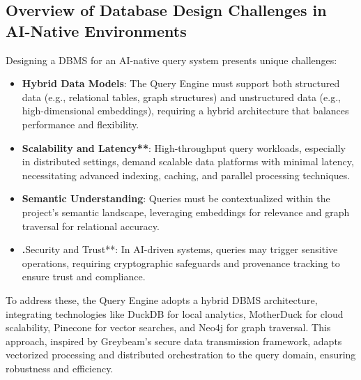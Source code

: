 \documentclass[11pt]{article}
\begin{document}
\subsection{Overview of Database Design Challenges in AI-Native Environments}
Designing a DBMS for an AI-native query system presents unique challenges:
\begin{itemize}
    \item \textbf{Hybrid Data Models}: The Query Engine must support both structured data (e.g., relational tables, graph structures) and unstructured data (e.g., high-dimensional embeddings), requiring a hybrid architecture that balances performance and flexibility.
    \item \textbf{Scalability and Latency**}: High-throughput query workloads, especially in distributed settings, demand scalable data platforms with minimal latency, necessitating advanced indexing, caching, and parallel processing techniques.
    \item \textbf{Semantic Understanding}: Queries must be contextualized within the project’s semantic landscape, leveraging embeddings for relevance and graph traversal for relational accuracy.
    \item \textbf.Security and Trust**: In AI-driven systems, queries may trigger sensitive operations, requiring cryptographic safeguards and provenance tracking to ensure trust and compliance.
\end{itemize}
To address these, the Query Engine adopts a hybrid DBMS architecture, integrating technologies like DuckDB for local analytics, MotherDuck for cloud scalability, Pinecone for vector searches, and Neo4j for graph traversal. This approach, inspired by Greybeam’s secure data transmission framework, adapts vectorized processing and distributed orchestration to the query domain, ensuring robustness and efficiency.
\end{document}
